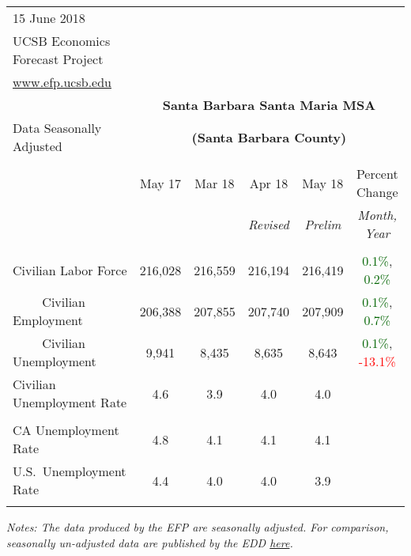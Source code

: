 \documentclass[12pt]{article}
\begin{document}
\begin{table}
\begin{tabular}{|l|c|c|c|c|c|}
\multicolumn{1}{l}{\small 15 June 2018} & \multicolumn{5}{c}{} \\
\multicolumn{1}{l}{\small UCSB Economics Forecast Project} & \multicolumn{5}{c}{} \\
\multicolumn{1}{l}{\small \href{http://www.efp.ucsb.edu/}{www.efp.ucsb.edu}} & \multicolumn{5}{c}{} \\
\multicolumn{1}{c}{} & \multicolumn{5}{c}{\large \textbf{Santa Barbara Santa Maria MSA}} \\
\multicolumn{1}{l}{\small Data Seasonally Adjusted} & \multicolumn{5}{c}{\small \textbf{(Santa Barbara County)}} \\ \hline \hline
& & & & & \\
 & May 17 & Mar 18 & Apr 18 & May 18 & Percent Change \\
 & & & \small \textit{Revised} & \small \textit{Prelim} & \small \textit{Month, Year} \\ \hline
& & & & & \\
Civilian Labor Force & 216,028 & 216,559 & 216,194 & 216,419 & \textcolor{darkgreen}{0.1\%}, \textcolor{darkgreen}{0.2\%} \\
$\qquad$ \small Civilian Employment & 206,388 & 207,855 & 207,740 & 207,909 & \textcolor{darkgreen}{0.1\%}, \textcolor{darkgreen}{0.7\%} \\
$\qquad$ \small Civilian Unemployment & 9,941 & 8,435 & 8,635 & 8,643 & \textcolor{darkgreen}{0.1\%}, \textcolor{red}{-13.1\%} \\
Civilian Unemployment Rate & 4.6 & 3.9 & 4.0 & 4.0 & \\
& & & & & \\
CA Unemployment Rate & 4.8 & 4.1 & 4.1 & 4.1 & \\
U.S.\ Unemployment Rate & 4.4 & 4.0 & 4.0 & 3.9 & \\
& & & & & \\ \hline \hline
\end{tabular}
\par
\vspace{.5em}
\footnotesize
\textit{Notes: The data produced by the EFP are seasonally adjusted. For comparison, seasonally un-adjusted data are published by the EDD \href{http://www.labormarketinfo.ca.gov/file/lfmonth/satb$pds.pdf}{here}.}
\end{table}
\end{document}
